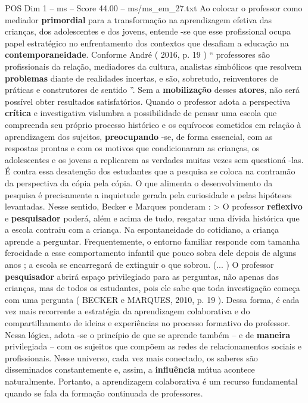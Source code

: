 \begin{textsample}{POS Dim 1 – ms – Score 44.00 – ms/ms\_em\_27.txt}
Ao colocar o professor como mediador \textbf{primordial} para a transformação na aprendizagem efetiva das crianças, dos adolescentes e dos jovens, entende -se que esse profissional ocupa papel estratégico no enfrentamento dos contextos que desafiam a educação na \textbf{contemporaneidade}.
Conforme André ( 2016, p. 19 ) “ professores são profissionais da relação, mediadores da cultura, analistas simbólicos que resolvem \textbf{problemas} diante de realidades incertas, e são, sobretudo, reinventores de práticas e construtores de sentido ”.
Sem a \textbf{mobilização} desses \textbf{atores}, não será possível obter resultados satisfatórios.
Quando o professor adota a perspectiva \textbf{crítica} e investigativa vislumbra a possibilidade de pensar uma escola que compreenda seu próprio processo histórico e os equívocos cometidos em relação à aprendizagem dos sujeitos, \textbf{preocupando} -se, de forma essencial, com as respostas prontas e com os motivos que condicionaram as crianças, os adolescentes e os jovens a replicarem as verdades muitas vezes sem questioná -las.
É contra essa desatenção dos estudantes que a pesquisa se coloca na contramão da perspectiva da cópia pela cópia.
O que alimenta o desenvolvimento da pesquisa é precisamente a inquietude gerada pela curiosidade e pelas hipóteses levantadas.
Nesse sentido, Becker e Marques ponderam : > O professor \textbf{reflexivo} e \textbf{pesquisador} poderá, além e acima de tudo, resgatar uma dívida histórica que a escola contraiu com a criança.
Na espontaneidade do cotidiano, a criança aprende a perguntar.
Frequentemente, o entorno familiar responde com tamanha ferocidade a esse comportamento infantil que pouco sobra dele depois de alguns anos ; a escola se encarregará de extinguir o que sobrou. (... ) O professor \textbf{pesquisador} abrirá espaço privilegiado para as perguntas, não apenas das crianças, mas de todos os estudantes, pois ele sabe que toda investigação começa com uma pergunta ( BECKER e MARQUES, 2010, p. 19 ).
Dessa forma, é cada vez mais recorrente a estratégia da aprendizagem colaborativa e do compartilhamento de ideias e experiências no processo formativo do professor.
Nessa lógica, adota -se o princípio de que se aprende também – e de \textbf{maneira} privilegiada – com os sujeitos que compõem as redes de relacionamentos sociais e profissionais.
Nesse universo, cada vez mais conectado, os saberes são disseminados constantemente e, assim, a \textbf{influência} mútua acontece naturalmente.
Portanto, a aprendizagem colaborativa é um recurso fundamental quando se fala da formação continuada de professores.

\end{textsample}
